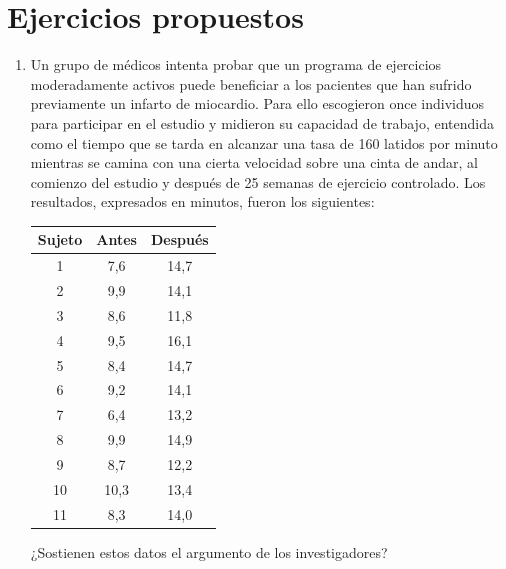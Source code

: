 \section{Ejercicios propuestos}
\begin{enumerate}[leftmargin=*]
\item Un grupo de médicos intenta probar que un programa de
ejercicios moderadamente activos puede beneficiar a los pacientes
que han sufrido previamente un infarto de miocardio. Para ello
escogieron once individuos para participar en el estudio y
midieron su capacidad de trabajo, entendida como el tiempo que se
tarda en alcanzar una tasa de 160 latidos por minuto mientras se
camina con una cierta velocidad sobre una cinta de andar, al
comienzo del estudio y después de 25 semanas de ejercicio
controlado. Los resultados, expresados en minutos, fueron los
siguientes:

\begin{center}
\begin{tabular}{lll}
\hline
\multicolumn{1}{c}{Sujeto} & \multicolumn{1}{c}{Antes} & \multicolumn{1}{c}{Después} \\
\hline
\multicolumn{1}{c}{1} & \multicolumn{1}{c}{7,6} & \multicolumn{1}{c}{14,7} \\
\multicolumn{1}{c}{2} & \multicolumn{1}{c}{9,9} & \multicolumn{1}{c}{14,1} \\
\multicolumn{1}{c}{3} & \multicolumn{1}{c}{8,6} & \multicolumn{1}{c}{11,8} \\
\multicolumn{1}{c}{4} & \multicolumn{1}{c}{9,5} & \multicolumn{1}{c}{16,1} \\
\multicolumn{1}{c}{5} & \multicolumn{1}{c}{8,4} & \multicolumn{1}{c}{14,7} \\
\multicolumn{1}{c}{6} & \multicolumn{1}{c}{9,2} & \multicolumn{1}{c}{14,1} \\
\multicolumn{1}{c}{7} & \multicolumn{1}{c}{6,4} & \multicolumn{1}{c}{13,2} \\
\multicolumn{1}{c}{8} & \multicolumn{1}{c}{9,9} & \multicolumn{1}{c}{14,9} \\
\multicolumn{1}{c}{9} & \multicolumn{1}{c}{8,7} & \multicolumn{1}{c}{12,2} \\
\multicolumn{1}{c}{10} & \multicolumn{1}{c}{10,3} & \multicolumn{1}{c}{13,4} \\
\multicolumn{1}{c}{11} & \multicolumn{1}{c}{8,3} & \multicolumn{1}{c}{14,0} \\
\hline
\end{tabular}
\end{center}
¿Sostienen estos datos el argumento de los investigadores?


\end{enumerate}
